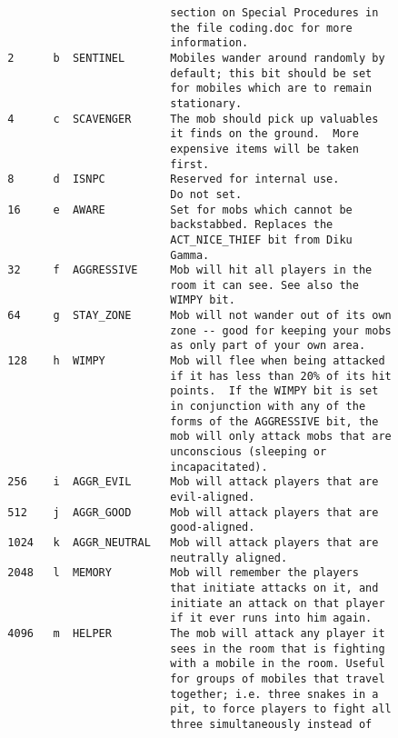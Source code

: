 \documentclass[11pt]{article}
\begin{document}
\begin{description}
\begin{verbatim}
                           section on Special Procedures in
                           the file coding.doc for more
                           information.
  2      b  SENTINEL       Mobiles wander around randomly by
                           default; this bit should be set
                           for mobiles which are to remain
                           stationary.
  4      c  SCAVENGER      The mob should pick up valuables
                           it finds on the ground.  More
                           expensive items will be taken
                           first.
  8      d  ISNPC          Reserved for internal use.
                           Do not set.
  16     e  AWARE          Set for mobs which cannot be
                           backstabbed. Replaces the
                           ACT_NICE_THIEF bit from Diku
                           Gamma.
  32     f  AGGRESSIVE     Mob will hit all players in the
                           room it can see. See also the
                           WIMPY bit.
  64     g  STAY_ZONE      Mob will not wander out of its own
                           zone -- good for keeping your mobs
                           as only part of your own area.
  128    h  WIMPY          Mob will flee when being attacked
                           if it has less than 20% of its hit
                           points.  If the WIMPY bit is set
                           in conjunction with any of the
                           forms of the AGGRESSIVE bit, the
                           mob will only attack mobs that are
                           unconscious (sleeping or
                           incapacitated).
  256    i  AGGR_EVIL      Mob will attack players that are
                           evil-aligned.
  512    j  AGGR_GOOD      Mob will attack players that are
                           good-aligned.
  1024   k  AGGR_NEUTRAL   Mob will attack players that are
                           neutrally aligned.
  2048   l  MEMORY         Mob will remember the players
                           that initiate attacks on it, and
                           initiate an attack on that player
                           if it ever runs into him again.
  4096   m  HELPER         The mob will attack any player it
                           sees in the room that is fighting
                           with a mobile in the room. Useful
                           for groups of mobiles that travel
                           together; i.e. three snakes in a
                           pit, to force players to fight all
                           three simultaneously instead of

\end{verbatim}
\end{description}
\end{document}
